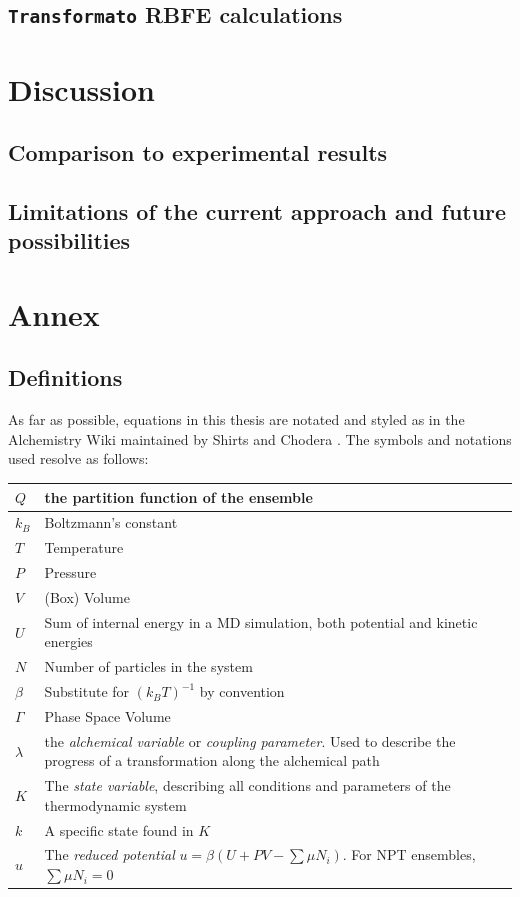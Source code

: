 \documentclass[oneside]{scrreprt}
\begin{document}
\section{\texttt{Transformato} RBFE calculations}

\newpage

\chapter{Discussion}

\section{Comparison to experimental results}
\section{Limitations of the current approach and future possibilities }
\chapter{Annex}
\section{Definitions}
As far as possible, equations in this thesis are notated and styled as in the Alchemistry Wiki maintained by Shirts and Chodera \cite{shirts_alchemistrywiki_nodate}. The symbols and notations used resolve as follows:
\begin{center}
    

\begin{tabular}{ | m{3cm} | m{10cm}| }
\hline
$Q$ & the partition function of the ensemble \\
\hline
$k_B$ & Boltzmann's constant\\
\hline
$T$ & Temperature \\
\hline
$P$ & Pressure \\
\hline
$V$ & (Box) Volume\\
\hline
$U$ & Sum of internal energy in a MD simulation, both potential and kinetic energies\\
\hline
$N$ & Number of particles in the system\\
\hline
$\beta$ & Substitute for $(k_B T)^{-1}$ by convention \\
\hline
$\Gamma$ & Phase Space Volume \\
\hline
$\lambda$ & the \emph{alchemical variable} or \emph{coupling parameter}. Used to describe the progress of a transformation along the alchemical path\\
\hline
$K$ & The \emph{state variable}, describing all conditions and parameters of the thermodynamic system\\
\hline
$k$ & A specific state found in $K$\\
\hline
$u$ & The \emph{reduced potential} $u=\beta(U+PV-\sum{\mu N_i}) $. For NPT ensembles, $\sum{\mu N_i} = 0$\\
\hline
\end{tabular}
\end{center}
\listoffigures

\listoftables

\printbibliography[title={References}]%
\end{document}
